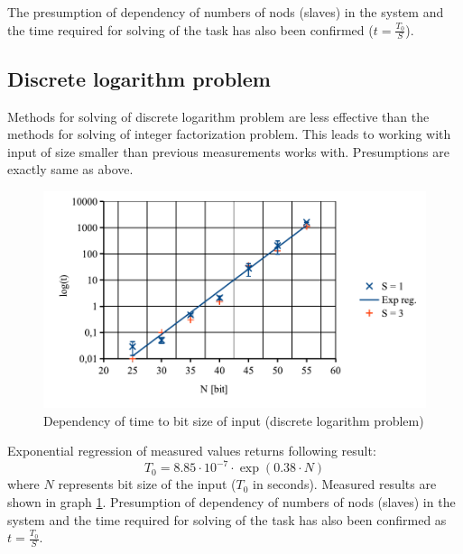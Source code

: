 \documentclass[conference]{IEEEtran}
\begin{document}
The presumption of dependency of numbers of nods (slaves) in the system and the time required for solving of the task has also been confirmed ($t=\frac{T_0}{S}$).

\subsection{Discrete logarithm problem}
Methods for solving of discrete logarithm problem are less effective than the methods for solving of integer factorization problem. This leads to working with input of size smaller than previous measurements works with. Presumptions are exactly same as above.

\begin{figure}[htbp]
\centerline{\includegraphics[scale=0.5]{DH1.pdf} \vspace{-10pt}}
\caption{\label{fig:DH}Dependency of time to bit size of input (discrete logarithm problem)}
\end{figure}

Exponential regression of measured values returns following result:
\begin{equation}
T_0 = 8.85 \cdot 10^{-7} \cdot \exp \left( 0.38 \cdot N \right)
\end{equation}
where $N$ represents bit size of the input ($T_0$ in seconds). Measured results are shown in graph \ref{fig:DH}. Presumption of dependency of numbers of nods (slaves) in the system and the time required for solving of the task has also been confirmed as $t=\frac{T_0}{S}$.
\end{document}
